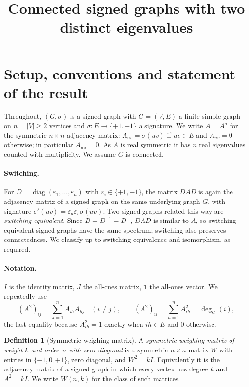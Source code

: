 \documentclass{amsart}
\theoremstyle{definition}
\newtheorem{definition}{Definition}
\begin{document}
\title{Connected signed graphs with two distinct eigenvalues}
\maketitle

\section{Setup, conventions and statement of the result}

Throughout, $(G,\sigma)$ is a signed graph with $G=(V,E)$ a finite simple
graph on $n=|V|\ge 2$ vertices and $\sigma\colon E\to\{+1,-1\}$ a signature.
We write $A=A^\sigma$ for the symmetric $n\times n$ adjacency matrix:
$A_{uv}=\sigma(uv)$ if $uv\in E$ and $A_{uv}=0$ otherwise; in particular
$A_{uu}=0$. As $A$ is real symmetric it has $n$ real eigenvalues counted with
multiplicity. We assume $G$ is connected.

\paragraph{Switching.}
For $D=\operatorname{diag}(\varepsilon_1,\dots,\varepsilon_n)$ with
$\varepsilon_i\in\{+1,-1\}$, the matrix $D A D$ is again the adjacency matrix
of a signed graph on the same underlying graph $G$, with signature
$\sigma'(uv)=\varepsilon_u\varepsilon_v\sigma(uv)$. Two signed graphs related
this way are \emph{switching equivalent}. Since $D=D^{-1}=D^\top$, $DAD$ is
similar to $A$, so switching equivalent signed graphs have the same spectrum;
switching also preserves connectedness. We classify up to switching
equivalence and isomorphism, as required.

\paragraph{Notation.} $I$ is the identity matrix, $J$ the all-ones matrix,
$\mathbf 1$ the all-ones vector. We repeatedly use
\begin{equation}\label{eq:walk}
(A^2)_{ij}=\sum_{h=1}^n A_{ih}A_{hj}\quad(i\ne j),\qquad
(A^2)_{ii}=\sum_{h=1}^n A_{ih}^2=\deg_G(i),
\end{equation}
the last equality because $A_{ih}^2=1$ exactly when $ih\in E$ and $0$ otherwise.

\begin{definition}[Symmetric weighing matrix]\label{def:weigh}
A \emph{symmetric weighing matrix of weight $k$ and order $n$ with zero
diagonal} is a symmetric $n\times n$ matrix $W$ with entries in
$\{-1,0,+1\}$, zero diagonal, and $W^2=kI$. Equivalently it is the adjacency
matrix of a signed graph in which every vertex has degree $k$ and $A^2=kI$. We
write $W(n,k)$ for the class of such matrices.
\end{definition}
\end{document}
